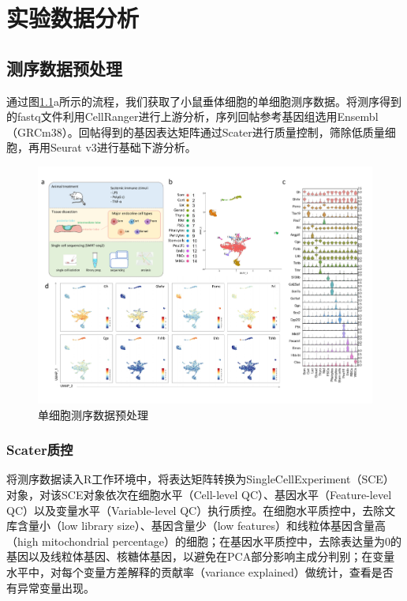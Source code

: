 
\chapter{实验数据分析}

\section{测序数据预处理}
  通过图\ref{fig:expr-fig1}a所示的流程，我们获取了小鼠垂体细胞的单细胞测序数据。将测序得到的fastq文件利用CellRanger进行上游分析，序列回帖参考基因组选用Ensembl（GRCm38）。回帖得到的基因表达矩阵通过Scater\cite{mccarthy2017scater}进行质量控制，筛除低质量细胞，再用Seurat v3\cite{butler2018integrating,stuart2019comprehensive}进行基础下游分析。

\begin{figure}[!htb]
  \centering
  \includegraphics[width=1.0\textwidth]{figs/expr-fig1.pdf}
  \caption{单细胞测序数据预处理}
  \label{fig:expr-fig1}
\end{figure}

\subsection{Scater质控}
  将测序数据读入R工作环境中，将表达矩阵转换为SingleCellExperiment（SCE）对象，对该SCE对象依次在细胞水平（Cell-level QC）、基因水平（Feature-level QC）以及变量水平（Variable-level QC）执行质控。在细胞水平质控中，去除文库含量小（low library size）、基因含量少（low features）和线粒体基因含量高（high mitochondrial percentage）的细胞；在基因水平质控中，去除表达量为0的基因以及线粒体基因、核糖体基因，以避免在PCA部分影响主成分判别；在变量水平中，对每个变量方差解释的贡献率（variance explained）做统计，查看是否有异常变量出现。

